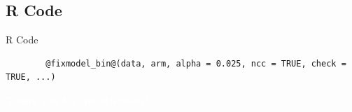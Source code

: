 \documentclass[10pt]{beamer} %
\begin{document}
\subsection{R Code}

\begin{frame}[fragile]{R Code}
	
	\begin{lstlisting}
		@fixmodel_bin@(data, arm, alpha = 0.025, ncc = TRUE, check = TRUE, ...)
	\end{lstlisting}  
	
\end{frame}



{\titlepageBluenNoFootline
	\begin{frame}
		
		\begin{center}
			\Large\textcolor{white}{\textbf{Thank you for the attention!}}
		\end{center}
		
	\end{frame}	
}
\end{document}

